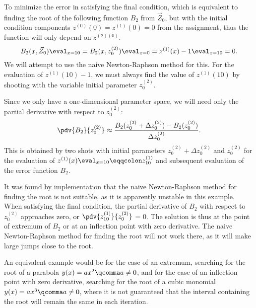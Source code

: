 \begin{example}
	\medskip
	To minimize the error in satisfying the final condition, which is equivalent to finding the root of the following function $B_{2}$ from $\vec{Z}_{0}$, but with the initial condition components $z^{(0)}(0) = z^{(1)}(0) = 0$ from the assignment, thus the function will only depend on $z^{(2)(0)}$.
	\begin{equation}
		B_{2}(x, \vec{Z}_{0}) \eval_{x = 10}= B_{2}(x, z^{(2)}_{0}) \eval_{x=0}= z^{(1)}(x) - 1 \eval_{x=10}= 0.
	\end{equation}
	We will attempt to use the naive Newton-Raphson method for this. For the evaluation of $z^{(1)}(10) - 1$, we must always find the value of $z^{(1)}(10)$ by shooting with the variable initial parameter $z^{(2)}_{0}$.

	\smallskip

	Since we only have a one-dimensional parameter space, we will need only the partial derivative with respect to $z_{0}^{(2)}$:
	\begin{equation}
		\pdv{B_{2}}{z^{(2)}_{0}} \approx \frac{B_{2}(z^{(2)}_{0} + \Delta z^{(2)}_{0}) - B_{2}(z^{(2)}_{0})}{\Delta z^{(2)}_{0}}.
	\end{equation}
	This is obtained by two shots with initial parameters $z^{(2)}_{0} + \Delta z^{(2)}_{0}$ and $z^{(2)}_{0}$ for the evaluation of $z^{(1)}(x)\eval_{x=10} \eqqcolon z^{(1)}_{10}$ and subsequent evaluation of the error function $B_{2}$.

	\bigskip

	It was found by implementation that the naive Newton-Raphson method for finding the root is not suitable, as it is apparently unstable in this example. When satisfying the final condition, the partial derivative of $B_{2}$ with respect to $z^{(2)}_{0}$ approaches zero, or $\pdv{z^{(1)}_{10}}{z^{(2)}_{0}}$ = 0. The solution is thus at the point of extremum of $B_{2}$ or at an inflection point with zero derivative. The naive Newton-Raphson method for finding the root will not work there, as it will make large jumps close to the root.

	\begin{remark}
		An equivalent example would be for the case of an extremum, searching for the root of a parabola $y(x) = ax^2\qcomma a \neq 0$, and for the case of an inflection point with zero derivative, searching for the root of a cubic monomial $y(x) = ax^3\qcomma a \neq 0$, where it is not guaranteed that the interval containing the root will remain the same in each iteration.
	\end{remark}


\end{example}
